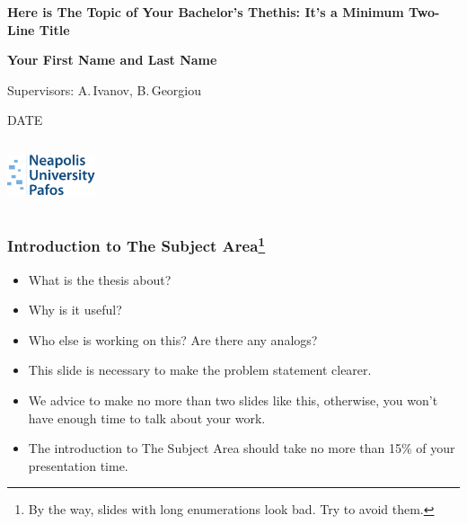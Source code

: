 \documentclass[12pt,aspectratio=169,hyperref={pdftex,unicode},xcolor=dvipsnames]{beamer}
\institute
{
    \begin{columns}
        \begin{column}{1.5cm}
            \includegraphics[height=30mm,keepaspectraticommon/nup-icon.pdf]
        \end{column}
        \begin{column}{3cm}
            Neapolis University Paphos
        \end{column}
    \end{columns}
}
\begin{document}
    \begin{frame}[plain]
        \begin{left}

        {\Large\textbf{Here is The Topic of Your Bachelor's Thethis: It's a Minimum Two-Line Title}}

            \vspace{5mm}
            \textbf{Your First Name and Last Name}

            {\small Supervisors: A.\,Ivanov, B.\,Georgiou}

            \vspace{10mm}
            DATE
        \end{left}

        \vspace{10mm}

        \begin{column}{1cm}
            \includegraphics[height=12mm,keepaspectratio]{./common/nup-logo.pdf}
        \end{column}
    \end{frame}



    \begin{frame}
        \frametitle{Introduction to The Subject Area\footnote{By the way, slides with long enumerations look bad. Try to avoid them.}}

        \begin{itemize}
            \item What is the thesis about?
            \item Why is it useful?
            \item Who else is working on this? Are there any analogs?
            \item This slide is necessary to make the problem statement clearer.
            \item We advice to make no more than two slides like this, otherwise, you won't have enough time to talk about your work.
            \item The introduction to The Subject Area should take no more than 15\% of your presentation time.
        \end{itemize}


    \end{frame}
\end{document}
